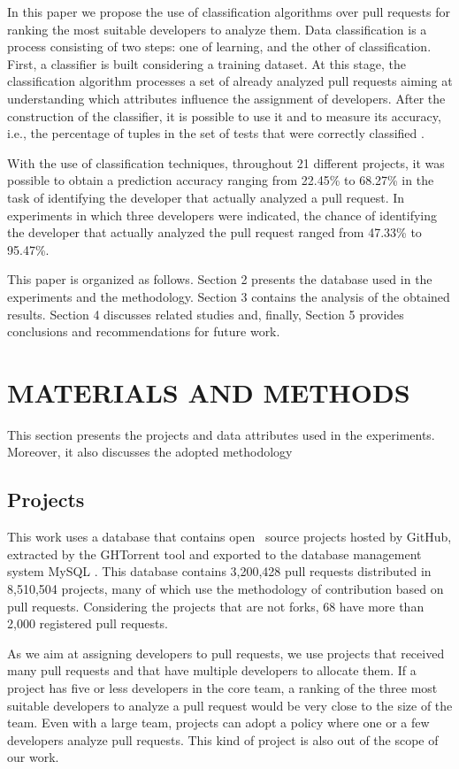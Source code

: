 \documentclass{sig-alternate}
\begin{document}
In this paper we propose the use of classification algorithms over pull requests for ranking the most suitable developers to analyze them. Data classification is a process consisting of two steps: one of learning, and the other of classification. First, a classifier is built considering a training dataset. At this stage, the classification algorithm processes a set of already analyzed pull requests aiming at understanding which attributes influence the assignment of developers. After the construction of the classifier, it is possible to use it and to measure its accuracy, i.e., the percentage of tuples in the set of tests that were correctly classified \cite{han_data_2011}.

With the use of classification techniques, throughout 21 different projects, it was possible to obtain a prediction accuracy ranging from 22.45\% to 68.27\% in the task of identifying the developer that actually analyzed a pull request. In experiments in which three developers were indicated, the chance of identifying the developer that actually analyzed the pull request ranged from 47.33\% to 95.47\%.

This paper is organized as follows. Section 2 presents the database used in the experiments and the methodology. Section 3 contains the analysis of the obtained results. Section 4 discusses related studies and, finally, Section 5 provides conclusions and recommendations for future work.

\section{MATERIALS AND METHODS}
This section presents the projects and data attributes used in the experiments. Moreover, it also discusses the adopted methodology

\subsection{Projects}
This work uses a database that contains open ~source projects hosted by GitHub, extracted by the GHTorrent tool and exported to the database management system MySQL \cite{gousios_ghtorent_2013, han_data_2011}. This database contains 3,200,428 pull requests distributed in 8,510,504 projects, many of which use the methodology of contribution based on pull requests. Considering the projects that are not forks, 68 have more than 2,000 registered pull requests.

As we aim at assigning developers to pull requests, we use projects that received many pull requests and that have multiple developers to allocate them. If a project has five or less developers in the core team, a ranking of the three most suitable developers to analyze a pull request would be very close to the size of the team. 
Even with a large team, projects can adopt a policy where one or a few developers analyze pull requests. This kind of project is also out of the scope of our work.
\end{document}
